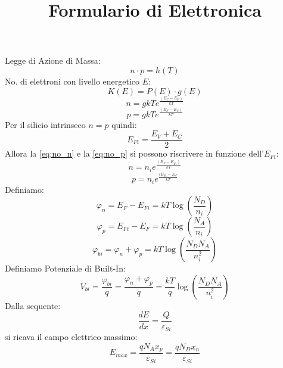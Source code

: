 \documentclass{article}
\title{Formulario di Elettronica}
\author{}
\date{}
\begin{document}
\maketitle

Legge di Azione di Massa:
\begin{equation*}
n \cdot p = h(T)
\end{equation*}
No. di elettroni con livello energetico $E$:
\begin{equation*}
K(E)=P(E) \cdot g(E)
\end{equation*}
\begin{equation} \label{eq:no_n}
n = gkTe^\frac{(E_C-E_F)}{kT}
\end{equation}
\begin{equation} \label{eq:no_p}
p = gkT e^\frac{(E_F-E_V)}{kT}
\end{equation}
Per il silicio intrinseco $n=p$ quindi:
\begin{equation*}
E_{Fi} = \frac{E_V + E_C}{2}
\end{equation*}
Allora la \eqref{eq:no_n} e la \eqref{eq:no_p} si possono riscrivere in funzione dell'$E_{Fi}$:
\begin{equation*}
n = n_i e^\frac{(E_F-E_{Fi})}{kT}
\end{equation*}
\begin{equation*}
p = n_i e^\frac{(E_{Fi}-E_F}{kT}
\end{equation*}
Definiamo:
\begin{equation*}
\varphi_n = E_F-E_{Fi} = kT \log(\frac{N_D}{n_i})
\end{equation*}
\begin{equation*}
\varphi_p = E_{Fi}-E_F = kT \log(\frac{N_A}{n_i})
\end{equation*}
\begin{equation*}
\varphi_{bi} = \varphi_n + \varphi_p = kT \log(\frac{N_DN_A}{n_i^2})
\end{equation*}
Definiamo Potenziale di Built-In:
\begin{equation*}
V_{bi} = \frac{\varphi_{bi}}{q} = \frac{\varphi_n + \varphi_p}{q} = \frac{kT}{q} \log(\frac{N_DN_A}{n_i^2})
\end{equation*}
Dalla sequente:
\begin{equation*}
\frac{dE}{dx} = \frac{Q}{\varepsilon_{Si}}
\end{equation*}
si ricava il campo elettrico massimo:
\begin{equation} \label{eq:e_max}
E_{max} = \frac{qN_Ax_p}{\varepsilon_{Si}} = \frac{qN_Dx_n}{\varepsilon_{Si}}
\end{equation}
\end{document}
